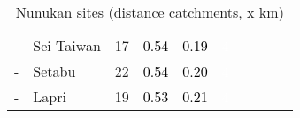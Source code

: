 \begin{table}[ht]
\begin{tabular}{C{0.05\textwidth}C{0.15\textwidth}C{0.08\textwidth}C{0.08\textwidth}C{0.08\textwidth}C{0.08\textwidth}C{0.08\textwidth}C{0.08\textwidth}C{0.08\textwidth}C{0.08\textwidth}}
  {-} & Sei Taiwan &  17 & \textcolor[HTML]{000000}{0.54} & \textcolor[HTML]{000000}{0.19} & \textcolor[HTML]{FFFFFF}{4} &  &  &  &  \\ 
  {-} & Setabu &  22 & \textcolor[HTML]{000000}{0.54} & \textcolor[HTML]{000000}{0.20} & \textcolor[HTML]{FFFFFF}{4} &  &  &  &  \\ 
  {-} & Lapri &  19 & \textcolor[HTML]{000000}{0.53} & \textcolor[HTML]{000000}{0.21} & \textcolor[HTML]{FFFFFF}{4} &  &  &  &  \\ 
  \end{tabular}
\endgroup
\caption{Nunukan sites (distance catchments, x km)} 
\label{tab:nunukan_dist}
\end{table}
